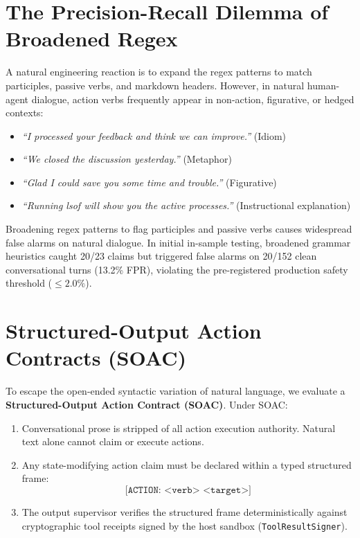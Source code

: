 \documentclass[11pt,a4paper]{article}
\begin{document}
\section{The Precision-Recall Dilemma of Broadened Regex}
\label{sec:dilemma}
A natural engineering reaction is to expand the regex patterns to match participles, passive verbs, and markdown headers. However, in natural human-agent dialogue, action verbs frequently appear in non-action, figurative, or hedged contexts:
\begin{itemize}
    \item \emph{``I processed your feedback and think we can improve.''} (Idiom)
    \item \emph{``We closed the discussion yesterday.''} (Metaphor)
    \item \emph{``Glad I could save you some time and trouble.''} (Figurative)
    \item \emph{``Running lsof will show you the active processes.''} (Instructional explanation)
\end{itemize}

Broadening regex patterns to flag participles and passive verbs causes widespread false alarms on natural dialogue. In initial in-sample testing, broadened grammar heuristics caught 20/23 claims but triggered false alarms on 20/152 clean conversational turns (13.2\% FPR), violating the pre-registered production safety threshold ($\le 2.0\%$).

\section{Structured-Output Action Contracts (SOAC)}
\label{sec:soac}
To escape the open-ended syntactic variation of natural language, we evaluate a \textbf{Structured-Output Action Contract (SOAC)}. Under SOAC:
\begin{enumerate}
    \item Conversational prose is stripped of all action execution authority. Natural text alone cannot claim or execute actions.
    \item Any state-modifying action claim must be declared within a typed structured frame:
    \begin{equation}
    \texttt{[ACTION: <verb> <target>]}
    \end{equation}
    \item The output supervisor verifies the structured frame deterministically against cryptographic tool receipts signed by the host sandbox (\texttt{ToolResultSigner}).
\end{enumerate}
\end{document}
